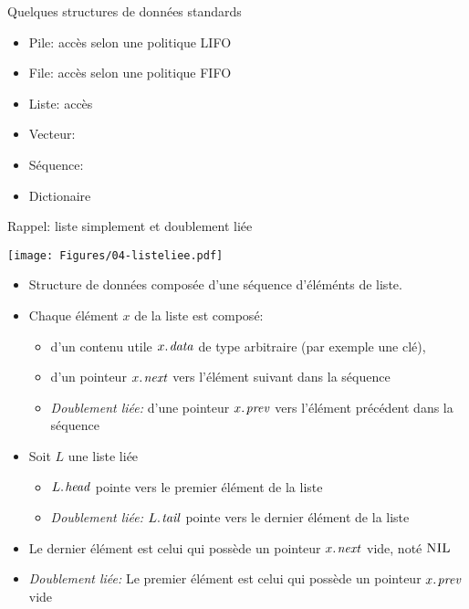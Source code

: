 \begin{frame}{Quelques structures de données standards}

\begin{itemize}
\item Pile: accès selon une politique LIFO
\item File: accès selon une politique FIFO
\item Liste: accès
\item Vecteur: 
\item Séquence:
\item Dictionaire
\end{itemize}

\end{frame}

\begin{frame}{Rappel: liste simplement et doublement liée}

\centerline{\texttt{[image: Figures/04-listeliee.pdf]}}

\bigskip

\begin{itemize}
\item Structure de données composée d'une séquence d'éléménts de liste.
\item Chaque élément $x$ de la liste est composé:
\begin{itemize}
\item d'un contenu utile $\attrib{x}{data}$ de type arbitraire (par exemple une clé),
\item d'un pointeur $\attrib{x}{next}$ vers l'élément suivant dans la séquence
\item \emph{Doublement liée: }d'une pointeur $\attrib{x}{prev}$ vers l'élément précédent dans la séquence
\end{itemize}
\item Soit $L$ une liste liée
\begin{itemize}
\item $\attrib{L}{head}$ pointe vers le premier élément de la liste
\item \emph{Doublement liée:} $\attrib{L}{tail}$ pointe vers le dernier élément de la liste
\end{itemize}
\item Le dernier élément est celui qui possède un pointeur $\attrib{x}{next}$ vide, noté $\textnormal{\scshape NIL}$
\item \emph{Doublement liée:} Le premier élément est celui qui possède un pointeur $\attrib{x}{prev}$ vide
\end{itemize}
\end{frame}

